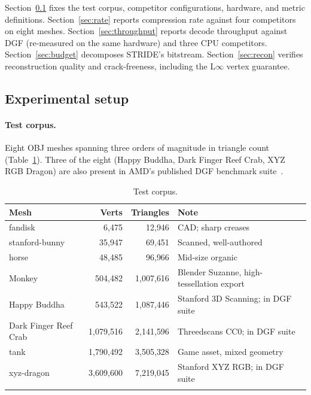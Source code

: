 \documentclass[pdflatex,sn-vancouver-num]{sn-jnl}%
\theoremstyle{thmstyleone}%
\theoremstyle{thmstyletwo}%
\theoremstyle{thmstylethree}%
\begin{document}
Section~\ref{sec:setup} fixes the test corpus, competitor configurations, hardware, and metric definitions. Section~\ref{sec:rate} reports compression rate against four competitors on eight meshes. Section~\ref{sec:throughput} reports decode throughput against DGF (re-measured on the same hardware) and three CPU competitors. Section~\ref{sec:budget} decomposes STRIDE's bitstream. Section~\ref{sec:recon} verifies reconstruction quality and crack-freeness, including the L$\infty$ vertex guarantee.

\subsection{Experimental setup}\label{sec:setup}

\paragraph{Test corpus.}
Eight OBJ meshes spanning three orders of magnitude in triangle count (Table~\ref{tab:corpus}). Three of the eight (Happy Buddha, Dark Finger Reef Crab, XYZ RGB Dragon) are also present in AMD's published DGF benchmark suite~\cite{ref09_amd_dgf_blog}.

\begin{table}[ht]
\caption{Test corpus.}\label{tab:corpus}
\begin{tabular*}{\textwidth}{@{\extracolsep\fill}lrrl@{}}
\toprule
Mesh & Verts & Triangles & Note \\
\midrule
fandisk                 & 6{,}475     & 12{,}946    & CAD; sharp creases \\
stanford-bunny          & 35{,}947    & 69{,}451    & Scanned, well-authored \\
horse                   & 48{,}485    & 96{,}966    & Mid-size organic \\
Monkey                  & 504{,}482   & 1{,}007{,}616 & Blender Suzanne, high-tessellation export \\
Happy Buddha            & 543{,}522   & 1{,}087{,}446 & Stanford 3D Scanning; in DGF suite~\cite{ref09_amd_dgf_blog} \\
Dark Finger Reef Crab   & 1{,}079{,}516 & 2{,}141{,}596 & Threedscans CC0; in DGF suite~\cite{ref09_amd_dgf_blog} \\
tank                    & 1{,}790{,}492 & 3{,}505{,}328 & Game asset, mixed geometry \\
xyz-dragon              & 3{,}609{,}600 & 7{,}219{,}045 & Stanford XYZ RGB; in DGF suite~\cite{ref09_amd_dgf_blog} \\
\botrule
\end{tabular*}
\end{table}
\end{document}
